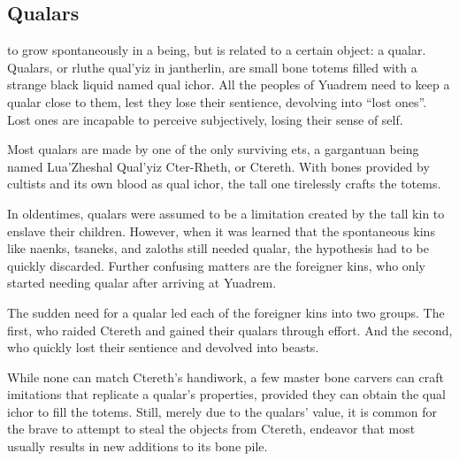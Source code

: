 \subsection*{Qualars} \label{ssec::qualars}

to grow spontaneously in a being, but is related to a certain object: a qualar.
Qualars, or rluthe qual'yiz in jantherlin, are small bone totems filled with a strange black liquid named qual ichor.
All the peoples of Yuadrem need to keep a qualar close to them, lest they lose their sentience, devolving into ``lost ones''.
Lost ones are incapable to perceive subjectively, losing their sense of self.

Most qualars are made by one of the only surviving ets, a gargantuan being named Lua'Zheshal Qual'yiz Cter-Rheth, or Ctereth.
With bones provided by cultists and its own blood as qual ichor, the tall one tirelessly crafts the totems.

In oldentimes, qualars were assumed to be a limitation created by the tall kin to enslave their children.
However, when it was learned that the spontaneous kins like naenks, tsaneks, and zaloths still needed qualar, the hypothesis had to be quickly discarded.
Further confusing matters are the foreigner kins, who only started needing qualar after arriving at Yuadrem.

The sudden need for a qualar led each of the foreigner kins into two groups.
The first, who raided Ctereth and gained their qualars through effort.
And the second, who quickly lost their sentience and devolved into beasts.

While none can match Ctereth's handiwork, a few master bone carvers can craft imitations that replicate a qualar's properties, provided they can obtain the qual ichor to fill the totems.
Still, merely due to the qualars' value, it is common for the brave to attempt to steal the objects from Ctereth, endeavor that most usually results in new additions to its bone pile.
